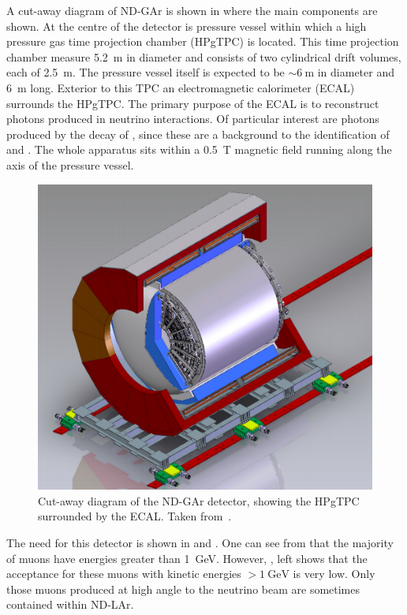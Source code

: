 A cut-away diagram of ND-GAr is shown in  where the main components are shown.
At the centre of the detector is pressure vessel within which a high pressure gas time projection chamber (HPgTPC) is located.
This time projection chamber measure \SI{5.2}{\metre} in diameter and consists of two cylindrical drift volumes, each of \SI{2.5}{\metre}.
The pressure vessel itself is expected to be $\sim\SI{6}{\metre}$ in diameter and \SI{6}{\metre} long. 
Exterior to this TPC an electromagnetic calorimeter (ECAL) surrounds the HPgTPC.
The primary purpose of the ECAL is to reconstruct photons produced in neutrino interactions.
Of particular interest are photons produced by the decay of \pizero, since these are a background to the identification of \nue and \anue.
The whole apparatus sits within a \SI{0.5}{\tesla} magnetic field running along the axis of the pressure vessel.

\begin{figure}[h]
  \centering
  \includegraphics[width=.7\linewidth]{files/figures/dune_detector/ndGarDiag}
  \caption[Cut-away of the ND-GAr detector.]{Cut-away diagram of the ND-GAr detector, showing the HPgTPC surrounded by the ECAL. Taken from~\cite{ndCdr}.}
  \label{fig:ndGarDiag}
\end{figure}

The need for this detector is shown in  and .
One can see from  that the majority of muons have energies greater than \SI{1}{\giga\electronvolt}.
However, , left shows that the acceptance for these muons with kinetic energies $>\SI{1}{\giga\electronvolt}$ is very low.
Only those muons produced at high angle to the neutrino beam are sometimes contained within ND-LAr.

